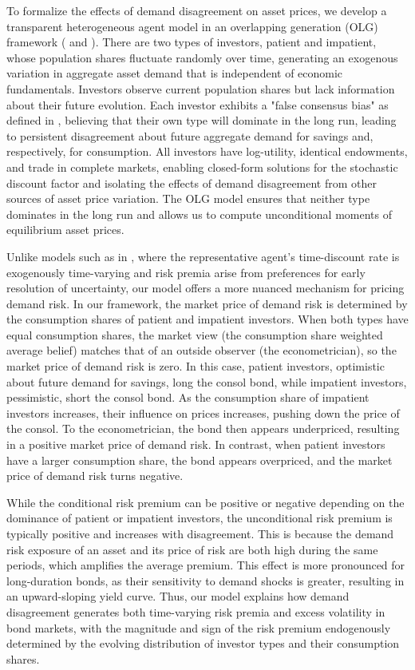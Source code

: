 \documentclass[preprint,11pt,authoryear]{elsarticle}
\theoremstyle{plain}
\begin{document}
To formalize the effects of demand disagreement on asset prices, we develop a transparent heterogeneous agent model in an overlapping generation (OLG) framework (\cite{Blanchard2013} and \cite{Garleanu2008}). There are two types of investors, patient and impatient, whose population shares fluctuate randomly over time, generating an exogenous variation in aggregate asset demand that is independent of economic fundamentals. Investors observe current population shares but lack information about their future evolution. Each investor exhibits a "false consensus bias" as defined in \cite{RossGreenHouse77}, believing that their own type will dominate in the long run, leading to persistent disagreement about future aggregate demand for savings and, respectively, for consumption. All investors have log-utility, identical endowments, and trade in complete markets, enabling closed-form solutions for the stochastic discount factor and isolating the effects of demand disagreement from other sources of asset price variation. The OLG model ensures that neither type dominates in the long run and allows us to compute unconditional moments of equilibrium asset prices.




Unlike models such as in \citep{ALBUQUERQUE2016}, where the representative agent's time-discount rate is exogenously time-varying and risk premia arise from preferences for early resolution of uncertainty, our model offers a more nuanced mechanism for pricing demand risk. In our framework, the market price of demand risk is determined by the consumption shares of patient and impatient investors. When both types have equal consumption shares, the market view (the consumption share weighted average belief) matches that of an outside observer (the econometrician), so the market price of demand risk is zero. In this case, patient investors, optimistic about future demand for savings, long the consol bond, while impatient investors, pessimistic, short the consol bond. As the consumption share of impatient investors increases, their influence on prices increases, pushing down the price of the consol. To the econometrician, the bond then appears underpriced, resulting in a positive market price of demand risk. In contrast, when patient investors have a larger consumption share, the bond appears overpriced, and the market price of demand risk turns negative.


While the conditional risk premium can be positive or negative depending on the dominance of patient or impatient investors, the unconditional risk premium is typically positive and increases with disagreement. This is because the demand risk exposure of an asset and its price of risk are both high during the same periods, which amplifies the average premium. This effect is more pronounced for long-duration bonds, as their sensitivity to demand shocks is greater, resulting in an upward-sloping yield curve. Thus, our model explains how demand disagreement generates both time-varying risk premia and excess volatility in bond markets, with the magnitude and sign of the risk premium endogenously determined by the evolving distribution of investor types and their consumption shares.
\end{document}
